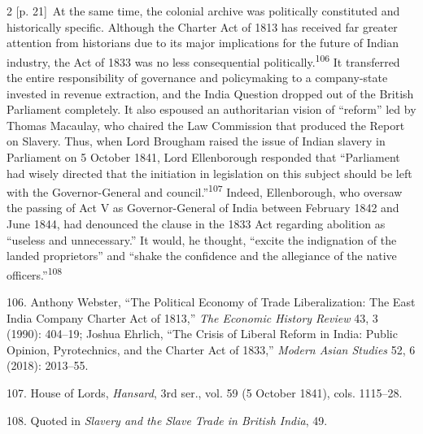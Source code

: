 \documentclass[10pt,a4paper]{article}
\begin{document}
\begin{paracol}{2}
{\scriptsize\color{gray} [p. 21]}\ At the same time, the colonial archive was politically constituted and historically specific. Although the Charter Act of 1813 has received far greater attention from historians due to its major implications for the future of Indian industry, the Act of 1833 was no less consequential politically.\nobreak\textsuperscript{106} It transferred the entire responsibility of governance and policymaking to a company-state invested in revenue extraction, and the India Question dropped out of the British Parliament completely. It also espoused an authoritarian vision of “reform” led by Thomas Macaulay, who chaired the Law Commission that produced the Report on Slavery. Thus, when Lord Brougham raised the issue of Indian slavery in Parliament on 5 October 1841, Lord Ellenborough responded that “Parliament had wisely directed that the initiation in legislation on this subject should be left with the Governor-General and council.”\nobreak\textsuperscript{107} Indeed, Ellenborough, who oversaw the passing of Act V as Governor-General of India between February 1842 and June 1844, had denounced the clause in the 1833 Act regarding abolition as “useless and unnecessary.” It would, he thought, “excite the indignation of the landed proprietors” and “shake the confidence and the allegiance of the native officers.”\nobreak\textsuperscript{108}\par{\small 106. Anthony Webster, “The Political Economy of Trade Liberalization: The East India Company Charter Act of 1813,” \textit{The Economic History Review} 43, 3 (1990): 404–19; Joshua Ehrlich, “The Crisis of Liberal Reform in India: Public Opinion, Pyrotechnics, and the Charter Act of 1833,” \textit{Modern Asian Studies} 52, 6 (2018): 2013–55.\par}{\small 107. House of Lords, \textit{Hansard}, 3rd ser., vol. 59 (5 October 1841), cols. 1115–28.\par}{\small 108. Quoted in \textit{Slavery and the Slave Trade in British India}, 49.\par}
\switchcolumn*

\end{paracol}
\end{document}
